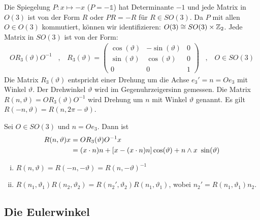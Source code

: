 Die Spiegelung $P: x \mapsto - x$ ($P = - \mathds{1}$) hat Determinante
$-1$ und jede Matrix in $O(3)$ ist von der Form $R$ oder $P R = - R$ für
$R \in SO(3)$. Da $P$ mit allen $O \in O(3)$ kommutiert, können wir
identifizieren: $O(3) \cong SO(3) \times \mathbb{Z}_2$. Jede Matrix in $SO(3)$
ist von der Form:
\begin{align*}
    O R_3 (\vartheta) O^{-1}
    \hspace{10pt} , \hspace{10pt}
    R_3 (\vartheta) = \begin{pmatrix}
        \cos(\vartheta) & - \sin(\vartheta) & 0 \\
        \sin(\vartheta) & \cos(\vartheta) & 0 \\
        0 & 0 & 1
    \end{pmatrix}
    \hspace{10pt} , \hspace{10pt}
    O \in SO(3)
\end{align*}
Die Matrix $R_3 (\vartheta)$ entspricht einer Drehung um die Achse $e_3'
= n = O e_3$ mit Winkel $\vartheta$. Der Drehwinkel $\vartheta$ wird im
Gegenuhrzeigersinn gemessen. Die Matrix $R(n,\vartheta) = O R_3 (\vartheta)
O^{-1}$ wird Drehung um $n$ mit Winkel $\vartheta$ genannt. Es gilt
$R(-n,\vartheta) = R(n,2 \pi - \vartheta)$.

\begin{lemma}
    Sei $O \in SO(3)$ und $n = O e_3$. Dann ist
    \begin{align*}
        R(n,\vartheta) x &= O R_3 (\vartheta) O^{-1} x
        \\
        &= (x \cdot n) n + \left[ x - (x \cdot n) n \right] \cos(\vartheta)
            + n \wedge x \ \sin(\vartheta)
    \end{align*}
\end{lemma}

\begin{lemma}
    \begin{enumerate}[(i)]
        \item $R(n,\vartheta) = R(-n,-\vartheta) = R(n,-\vartheta)^{-1}$
        \item $R(n_1,\vartheta_1)R(n_2,\vartheta_2) = R(n_2',\vartheta_2) R(n_1,\vartheta_1)$,
            wobei $n_2' = R(n_1,\vartheta_1) n_2$. 
    \end{enumerate}
\end{lemma}

\subsection{Die Eulerwinkel}


